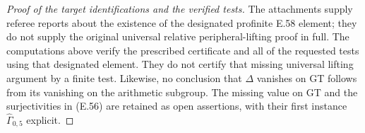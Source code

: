 \begin{proof}[Proof of the target identifications and the verified tests]
The attachments supply referee reports about the
existence of the designated profinite E.58 element;
they do not supply the original universal relative
peripheral-lifting proof in full.  The computations
above verify the prescribed certificate and all
of the requested tests using that designated
element.  They do not certify that missing
universal lifting argument by a finite test.
Likewise, no conclusion that $\Delta$ vanishes
on GT follows from its vanishing on the
arithmetic subgroup.  The missing value on GT
and the surjectivities in (E.56) are retained as
open assertions, with their first instance
$\widehat\Gamma_{0,5}$ explicit.
\end{proof}
